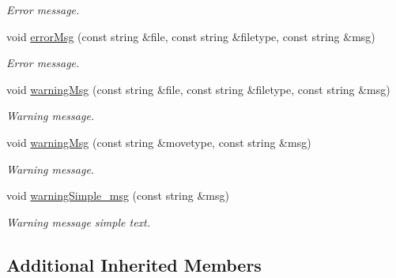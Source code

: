 \begin{DoxyCompactItemize}
\begin{DoxyCompactList}\small\item\em Error message. \end{DoxyCompactList}\item 
\mbox{\label{classUtils_1_1ErrorHandler_a8f0a658e09dfcd13d3b075ff9080554f}} 
void \mbox{\hyperlink{classUtils_1_1ErrorHandler_a8f0a658e09dfcd13d3b075ff9080554f}{error\+Msg}} (const string \&file, const string \&filetype, const string \&msg)
\begin{DoxyCompactList}\small\item\em Error message. \end{DoxyCompactList}\item 
\mbox{\label{classUtils_1_1ErrorHandler_a42f8bebc7f7a9a80c7b763d82afe2074}} 
void \mbox{\hyperlink{classUtils_1_1ErrorHandler_a42f8bebc7f7a9a80c7b763d82afe2074}{warning\+Msg}} (const string \&file, const string \&filetype, const string \&msg)
\begin{DoxyCompactList}\small\item\em Warning message. \end{DoxyCompactList}\item 
\mbox{\label{classUtils_1_1ErrorHandler_adb593ecfc758b7ddc5143e6a136bb53c}} 
void \mbox{\hyperlink{classUtils_1_1ErrorHandler_adb593ecfc758b7ddc5143e6a136bb53c}{warning\+Msg}} (const string \&movetype, const string \&msg)
\begin{DoxyCompactList}\small\item\em Warning message. \end{DoxyCompactList}\item 
\mbox{\label{classUtils_1_1ErrorHandler_afacf74c2bb2aefb55a2bf4efa561e92e}} 
void \mbox{\hyperlink{classUtils_1_1ErrorHandler_afacf74c2bb2aefb55a2bf4efa561e92e}{warning\+Simple\+\_\+msg}} (const string \&msg)
\begin{DoxyCompactList}\small\item\em Warning message simple text. \end{DoxyCompactList}\end{DoxyCompactItemize}
\subsection*{Additional Inherited Members}


